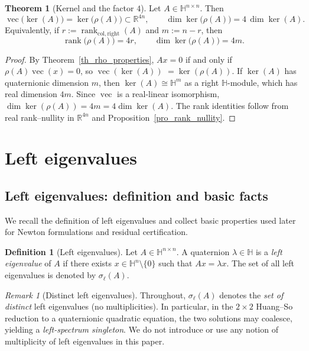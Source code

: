 \documentclass[preprint,12pt]{elsarticle}  %
\theoremstyle{definition}
\newtheorem{Def}{Definition}
\theoremstyle{definition}
\newtheorem{The}{Theorem}
\theoremstyle{definition}
\theoremstyle{definition}
\theoremstyle{definition}
\theoremstyle{remark}
\newtheorem{Rem}{Remark}
\theoremstyle{remark}
\theoremstyle{remark}
\newcommand{\RR}{\mathbb{R}}
\newcommand{\HH}{\mathbb{H}}
\DeclareMathOperator{\rank}{rank}
\DeclareMathOperator{\rvec}{vec}
\begin{document}
\begin{The}[Kernel and the factor $4$]
\label{th_rho_kernel_rank}
Let $A\in\HH^{n\times n}$. Then
\[
\rvec\bigl(\ker(A)\bigr)=\ker\bigl(\rho(A)\bigr)\subset\RR^{4n},
\qquad
\dim\ker\bigl(\rho(A)\bigr)=4\,\dim\ker(A).
\]
Equivalently, if $r:=\rank_{\mathrm{col,right}}(A)$ and $m:=n-r$, then
\[
\rank\bigl(\rho(A)\bigr)=4r,\qquad \dim\ker\bigl(\rho(A)\bigr)=4m.
\]
\end{The}
\begin{proof}
By Theorem~\ref{th_rho_properties}, $Ax=0$ if and only if $\rho(A)\rvec(x)=0$, so 
$\rvec(\ker(A))$ $=\ker(\rho(A))$.
If $\ker(A)$ has quaternionic dimension $m$, then $\ker(A)\cong\HH^m$ as a right $\HH$-module, which has real dimension $4m$. Since $\rvec$ is a real-linear isomorphism, $\dim\ker(\rho(A))=4m=4\dim\ker(A)$. The rank identities follow from real rank--nullity in $\RR^{4n}$ and Proposition~\ref{pro_rank_nullity}.
\end{proof}

\section{Left eigenvalues}
\label{sec_left_eigs_background}
\subsection{Left eigenvalues: definition and basic facts}
\label{subsec_left_definition_basic}
We recall the definition of left eigenvalues and collect basic properties used later for Newton formulations and residual certification.

\begin{Def}[Left eigenvalues]
\label{def_left_eigs}
Let $A\in\HH^{n\times n}$.
A quaternion $\lambda\in\HH$ is a \emph{left eigenvalue} of $A$ if there exists
$x\in\HH^n\setminus\{0\}$ such that $Ax=\lambda x$.
The set of all left eigenvalues is denoted by $\sigma_\ell(A)$.
\end{Def}

\begin{Rem}[Distinct left eigenvalues]
Throughout, $\sigma_\ell(A)$ denotes the \emph{set of distinct} left eigenvalues (no multiplicities).
In particular, in the $2\times2$ Huang--So reduction to a quaternionic quadratic equation, the two
solutions may coalesce, yielding a \emph{left-spectrum singleton}.
We do not introduce or use any notion of multiplicity of left eigenvalues in this paper.
\end{Rem}
\end{document}
